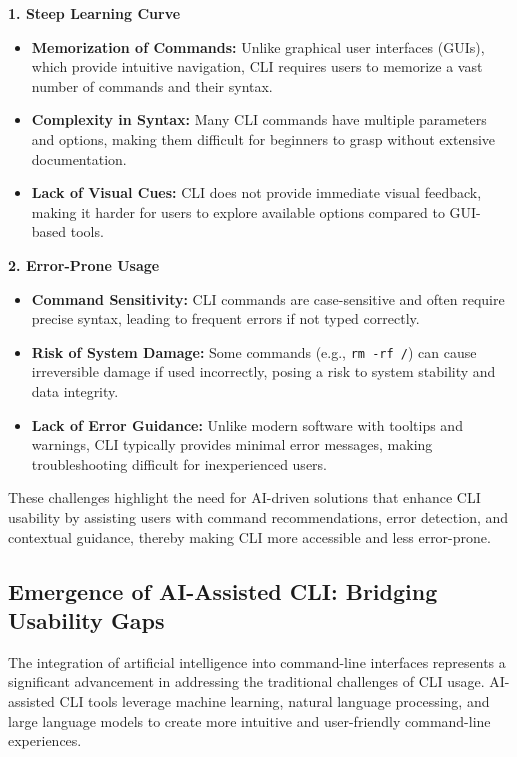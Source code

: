 \textbf{1. Steep Learning Curve}
\begin{itemize}
	\item \textbf{Memorization of Commands:} Unlike graphical user interfaces (GUIs), which provide intuitive navigation, CLI requires users to memorize a vast number of commands and their syntax.
	\item \textbf{Complexity in Syntax:} Many CLI commands have multiple parameters and options, making them difficult for beginners to grasp without extensive documentation.
	\item \textbf{Lack of Visual Cues:} CLI does not provide immediate visual feedback, making it harder for users to explore available options compared to GUI-based tools.
\end{itemize}

\textbf{2. Error-Prone Usage}
\begin{itemize}
	\item \textbf{Command Sensitivity:} CLI commands are case-sensitive and often require precise syntax, leading to frequent errors if not typed correctly.
	\item \textbf{Risk of System Damage:} Some commands (e.g., \texttt{rm -rf /}) can cause irreversible damage if used incorrectly, posing a risk to system stability and data integrity.
	\item \textbf{Lack of Error Guidance:} Unlike modern software with tooltips and warnings, CLI typically provides minimal error messages, making troubleshooting difficult for inexperienced users.
\end{itemize}

These challenges highlight the need for AI-driven solutions that enhance CLI usability by assisting users with command recommendations, error detection, and contextual guidance, thereby making CLI more accessible and less error-prone.

\subsection{Emergence of AI-Assisted CLI: Bridging Usability Gaps}

The integration of artificial intelligence into command-line interfaces represents a significant advancement in addressing the traditional challenges of CLI usage. AI-assisted CLI tools leverage machine learning, natural language processing, and large language models to create more intuitive and user-friendly command-line experiences.


